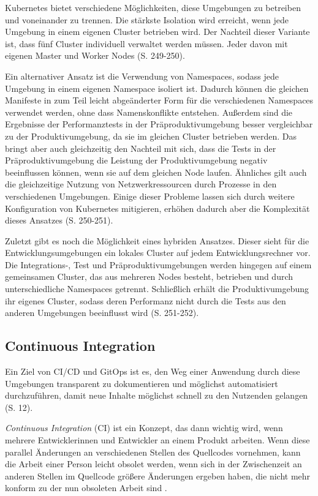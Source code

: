 \documentclass[11pt,a4paper]{article}
\begin{document}
Kubernetes bietet verschiedene Möglichkeiten, diese Umgebungen zu betreiben und voneinander zu trennen.
Die stärkste Isolation wird erreicht, wenn jede Umgebung in einem eigenen Cluster betrieben wird.
Der Nachteil dieser Variante ist, dass fünf Cluster individuell verwaltet werden müssen.
Jeder davon mit eigenen Master und Worker Nodes \cite{Schmeling_Dargatz_2022} (S. 249-250).

Ein alternativer Ansatz ist die Verwendung von Namespaces, sodass jede Umgebung in einem eigenen
Namespace isoliert ist.
Dadurch können die gleichen Manifeste in zum Teil leicht abgeänderter Form für die verschiedenen
Namespaces verwendet werden, ohne dass Namenskonflikte entstehen. Außerdem sind die Ergebnisse
der Performanztests in der Präproduktivumgebung besser vergleichbar zu der Produktivumgebung,
da sie im gleichen Cluster betrieben werden.
Das bringt aber auch gleichzeitig den Nachteil mit sich, dass die Tests in der Präproduktivumgebung
die Leistung der Produktivumgebung negativ beeinflussen können, wenn sie auf dem gleichen Node laufen.
Ähnliches gilt auch die gleichzeitige Nutzung von Netzwerkressourcen durch Prozesse in den
verschiedenen Umgebungen. Einige dieser Probleme lassen sich durch weitere Konfiguration
von Kubernetes mitigieren, erhöhen dadurch aber die Komplexität dieses Ansatzes \cite{Schmeling_Dargatz_2022} (S. 250-251).

Zuletzt gibt es noch die Möglichkeit eines hybriden Ansatzes.
Dieser sieht für die Entwicklungsumgebungen ein lokales Cluster auf jedem Entwicklungsrechner vor.
Die Integrations-, Test und Präproduktivumgebungen werden hingegen auf einem gemeinsamen Cluster,
das aus mehreren Nodes besteht, betrieben und durch unterschiedliche Namespaces getrennt.
Schließlich erhält die Produktivumgebung ihr eigenes Cluster, sodass deren Performanz
nicht durch die Tests aus den anderen Umgebungen beeinflusst wird \cite{Schmeling_Dargatz_2022} (S. 251-252).

\subsection{Continuous Integration}
Ein Ziel von CI/CD und GitOps ist es, den Weg einer Anwendung durch
diese Umgebungen transparent zu dokumentieren und möglichst automatisiert
durchzuführen, damit neue Inhalte möglichst schnell zu den
Nutzenden gelangen \cite{cicd_with_kubernetes_devops} (S. 12).

\emph{Continuous Integration} (CI) ist ein Konzept, das dann wichtig wird, wenn mehrere
Entwicklerinnen und Entwickler an einem Produkt arbeiten.
Wenn diese parallel Änderungen an verschiedenen Stellen des Quellcodes
vornehmen, kann die Arbeit einer Person leicht obsolet werden,
wenn sich in der Zwischenzeit an anderen Stellen im Quellcode größere
Änderungen ergeben haben, die nicht mehr konform zu der nun obsoleten Arbeit sind \cite{fowler_Continuous_Integration}.
\end{document}
